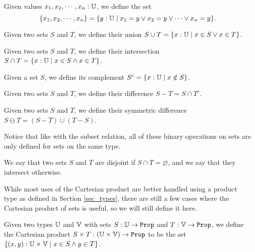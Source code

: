 \documentclass[../../math.tex]{subfiles}
\begin{document}
\begin{definition}
    Given values $x_1, x_2, \cdots, x_n : \mathbb{U}$, we define the set
    \[
        \{x_1, x_2, \cdots, x_n\} =
        \{y : \mathbb{U} \mid x_1 = y \vee x_2 = y \vee \cdots \vee x_n = y\}.
    \]
\end{definition}

\begin{definition}
    Given two sets $S$ and $T$, we define their union $S \cup T = \{x : \mathbb{U} \mid
    x \in S \vee x \in T\}$.
\end{definition}

\begin{definition}
    Given two sets $S$ and $T$, we define their intersection $S \cap T = \{x :
    \mathbb{U} \mid x \in S \wedge x \in T\}$.
\end{definition}

\begin{definition}
    Given a set $S$, we define its complement $S^c = \{x : \mathbb{U} \mid x \notin
    S\}$.
\end{definition}

\begin{definition}
    Given two sets $S$ and $T$, we define their difference $S - T = S \cap T^c$.
\end{definition}

\begin{definition}
    Given two sets $S$ and $T$, we define their symmetric difference $S \ominus
    T = (S - T) \cup (T - S)$.
\end{definition}
\noindent Notice that like with the subset relation, all of these binary
operations on sets are only defined for sets on the same type.

\begin{definition}
    We say that two sets $S$ and $T$ are disjoint if $S \cap T = \varnothing$,
    and we say that they intersect otherwise.
\end{definition}

While most uses of the Cartesian product are better handled using a product type
as defined in Section \ref{sec_types}, there are still a few cases where the
Cartesian product of sets is useful, so we will still define it here.
\begin{definition}
    Given two types $\mathbb{U}$ and $\mathbb{V}$ with sets $S : \U \to \Prop$ and $T : \V \to
    \Prop$, we define the Cartesian product $S \times T : (\U \times \V) \to
    \Prop$ to be the set $\{(x, y) : \mathbb{U} \times \mathbb{V} \mid x \in S \wedge y \in
    T\}$.
\end{definition}
\end{document}
